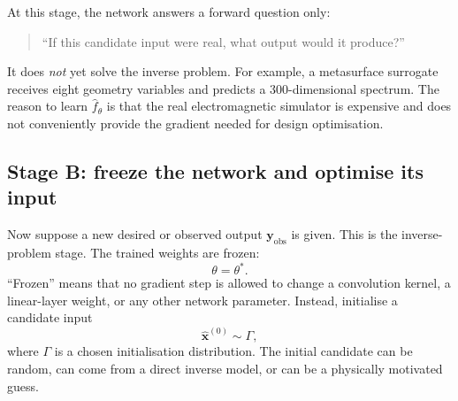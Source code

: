 \documentclass[11pt]{article}
\newcommand{\vect}[1]{\mathbf{#1}}
\begin{document}
At this stage, the network answers a forward question only:
\begin{quote}
``If this candidate input were real, what output would it produce?''
\end{quote}
It does \emph{not} yet solve the inverse problem. For example, a metasurface surrogate receives eight geometry variables and predicts a 300-dimensional spectrum. The reason to learn $\hat f_{\theta}$ is that the real electromagnetic simulator is expensive and does not conveniently provide the gradient needed for design optimisation.

\subsection{Stage B: freeze the network and optimise its input}

Now suppose a new desired or observed output $\vect{y}_{\mathrm{obs}}$ is given. This is the inverse-problem stage. The trained weights are frozen:
\begin{equation}
    \theta=\theta^\ast.
    \label{eq:na_freeze}
\end{equation}
``Frozen'' means that no gradient step is allowed to change a convolution kernel, a linear-layer weight, or any other network parameter. Instead, initialise a candidate input
\begin{equation}
    \hat{\vect{x}}^{(0)}\sim\Gamma,
    \label{eq:na_initialise}
\end{equation}
where $\Gamma$ is a chosen initialisation distribution. The initial candidate can be random, can come from a direct inverse model, or can be a physically motivated guess.
\end{document}
